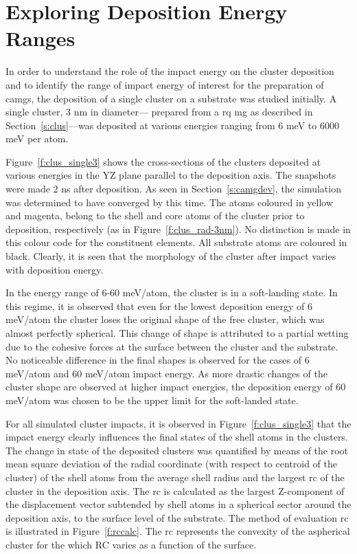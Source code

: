 \section{Exploring Deposition Energy Ranges} \label{c:cibd_single}
\begin{changebar}
In order to understand the role of the impact energy on the cluster deposition and to identify the range of impact energy of interest for the preparation of \gls{camg}s, the deposition of a single cluster on a substrate was studied initially. A single \cz cluster, 3 nm in diameter— prepared from a  \gls{rq} \gls{mg} as described in Section~\ref{s:clus}---was deposited at various energies ranging from 6 meV to 6000 meV per atom. \par

Figure~\ref{f:clus_single3} shows the cross-sections of the clusters deposited at various energies in the YZ plane parallel to the deposition axis. The snapshots were made 2 ns after deposition. As seen in Section~\ref{s:camgdev}, the simulation was determined to have converged by this time. The atoms coloured in yellow and magenta, belong to the shell and core atoms of the cluster prior to deposition, respectively (as in Figure~\ref{f:clus_rad-3nm}). No distinction is made in this colour code for the constituent elements. All substrate atoms are coloured in black. Clearly, it is seen that the morphology of the cluster after impact varies with deposition energy. \par

In the energy range of 6-60 meV/atom, the cluster is in a soft-landing state. In this regime, it is observed that even for the lowest deposition energy of 6 meV/atom the cluster loses the original shape of the free cluster, which was almost perfectly spherical. This change of shape is attributed to a partial wetting due to the cohesive forces at the surface between the cluster and the substrate. No noticeable difference in the final shapes is observed for the cases of 6 meV/atom and 60 meV/atom impact energy. As more drastic changes of the cluster shape are observed at higher impact energies, the deposition energy of 60 meV/atom was chosen to be the upper limit for the soft-landed state. \par
	
For all simulated cluster impacts, it is observed in Figure~\ref{f:clus_single3} that the impact energy clearly influences the final states of the shell atoms in the clusters. The change in state of the deposited clusters was quantified by means of the root mean square deviation of the radial coordinate (with respect to centroid of the cluster) of the shell atoms from the average shell radius and the largest \gls{rc} of the cluster in the deposition axis. The \gls{rc} is calculated as the largest Z-component of the displacement vector subtended by shell atoms in a spherical sector around the deposition axis, to the surface level of the substrate. The method of evaluation \gls{rc} is illustrated in Figure~\ref{f:rccalc}. The \gls{rc} represents the convexity of the aspherical cluster for the which RC varies as a function of the surface. \par


\end{changebar}
